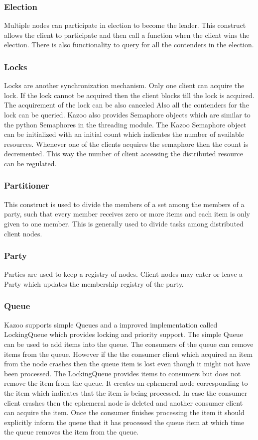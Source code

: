   \subsubsection{Election}
  Multiple nodes can participate in election to become the leader. This construct allows the client to participate and then call a function when the client wins the election. There is also functionality to query for all the contenders in the election.
  \subsubsection{Locks}
    Locks are another synchronization mechanism. Only one client can acquire the lock. If the lock cannot be acquired then the client blocks till the lock is acquired. The acquirement of the lock can be also canceled Also all the contenders for the lock can be queried. Kazoo also provides Semaphore objects which are similar to the python Semaphores in the threading module. The Kazoo Semaphore object can be initialized with an initial count which indicates the number of available resources. Whenever one of the clients acquires the semaphore then the count is decremented. This way the number of client accessing the distributed resource can be regulated.
  \subsubsection{Partitioner}
  This construct is used to divide the members of a set among the members of a party, such that every member receives zero or more items and each item is only given to one member. This is generally used to divide tasks among distributed client nodes.
  \subsubsection{Party}
    Parties are used to keep a registry of nodes. Client nodes may enter or leave a Party which updates the membership registry of the party.
  \subsubsection{Queue}
    Kazoo supports simple Queues and a improved implementation called LockingQueue which provides locking and priority support. The simple Queue can be used to add items into the queue. The consumers of the queue can remove items from the queue. However if the the consumer client which acquired an item from the node crashes then the queue item is lost even though it might not have been processed. The LockingQueue provides items to consumers but does not remove the item from the queue. It creates an ephemeral node corresponding to the item which indicates that the item is being processed. In case the consumer client crashes then the ephemeral node is deleted and another consumer client can acquire the item. Once the consumer finishes processing the item it should explicitly inform the queue that it has processed the queue item at which time the queue removes the item from the queue.
